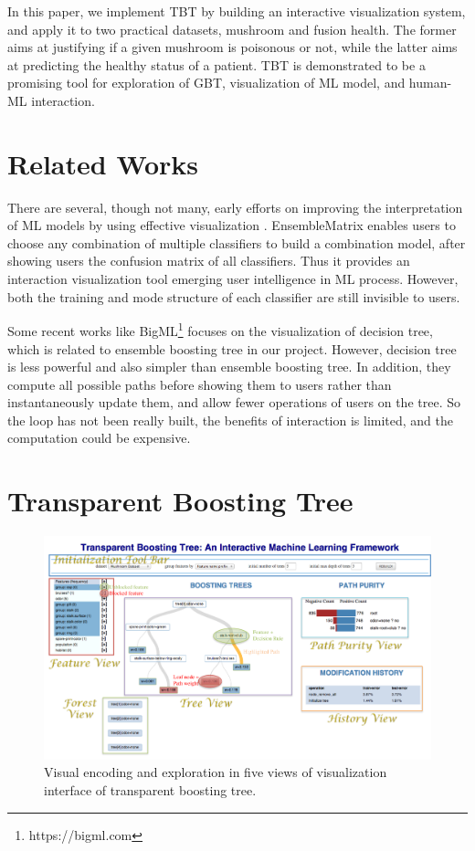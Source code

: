 \documentclass{chi2009}
\begin{document}
In this paper, we implement TBT by building an interactive visualization system, and apply it to two practical datasets, mushroom and fusion health. The former aims at justifying if a given mushroom is poisonous or not, while the latter aims at predicting the healthy status of a patient. TBT is demonstrated to be a promising tool for exploration of GBT, visualization of ML model, and human-ML interaction.

\section{Related Works}

There are several, though not many, early efforts on improving the interpretation of ML models by using effective visualization \cite{aai}. EnsembleMatrix \cite{Ematrix} enables users to choose any combination of multiple classifiers to build a combination model, after showing users the confusion matrix of all classifiers. Thus it provides an interaction visualization tool emerging user intelligence in ML process. However, both the training and mode structure of each classifier are still invisible to users.

Some recent works like BigML\footnote{https://bigml.com} focuses on the visualization of decision tree, which is related to ensemble boosting tree in our project. However, decision tree is less powerful and also simpler than ensemble boosting tree. In addition, they compute all possible paths before showing them to users rather than instantaneously update them, and allow fewer operations of users on the tree. So the loop has not been really built, the benefits of interaction is limited, and the computation could be expensive.

\section{Transparent Boosting Tree}

\begin{figure}[tH!]
\begin{center}
 \includegraphics[width=1\linewidth]{intface.pdf}
\end{center}
   \caption{Visual encoding and exploration in five views of visualization interface of transparent boosting tree.}
\label{fig:interface}
\end{figure} 
\end{document}
